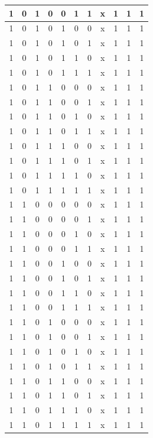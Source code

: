 \documentclass[conference]{IEEEtran}
\begin{document}
\begin{table}[htbp]
\begin{center}
\begin{tabular}{|c|c|c|c|c|c|c|c|c|c|c|}
\hline
1 & 0 & 1 & 0 & 0 & 1 & 1 & x & 1 & 1 & 1 \\
\hline
1 & 0 & 1 & 0 & 1 & 0 & 0 & x & 1 & 1 & 1 \\
\hline
1 & 0 & 1 & 0 & 1 & 0 & 1 & x & 1 & 1 & 1 \\
\hline
1 & 0 & 1 & 0 & 1 & 1 & 0 & x & 1 & 1 & 1 \\
\hline
1 & 0 & 1 & 0 & 1 & 1 & 1 & x & 1 & 1 & 1 \\
\hline
1 & 0 & 1 & 1 & 0 & 0 & 0 & x & 1 & 1 & 1 \\
\hline
1 & 0 & 1 & 1 & 0 & 0 & 1 & x & 1 & 1 & 1 \\
\hline
1 & 0 & 1 & 1 & 0 & 1 & 0 & x & 1 & 1 & 1 \\
\hline
1 & 0 & 1 & 1 & 0 & 1 & 1 & x & 1 & 1 & 1 \\
\hline
1 & 0 & 1 & 1 & 1 & 0 & 0 & x & 1 & 1 & 1 \\
\hline
1 & 0 & 1 & 1 & 1 & 0 & 1 & x & 1 & 1 & 1 \\
\hline
1 & 0 & 1 & 1 & 1 & 1 & 0 & x & 1 & 1 & 1 \\
\hline
1 & 0 & 1 & 1 & 1 & 1 & 1 & x & 1 & 1 & 1 \\
\hline
1 & 1 & 0 & 0 & 0 & 0 & 0 & x & 1 & 1 & 1 \\
\hline
1 & 1 & 0 & 0 & 0 & 0 & 1 & x & 1 & 1 & 1 \\
\hline
1 & 1 & 0 & 0 & 0 & 1 & 0 & x & 1 & 1 & 1 \\
\hline
1 & 1 & 0 & 0 & 0 & 1 & 1 & x & 1 & 1 & 1 \\
\hline
1 & 1 & 0 & 0 & 1 & 0 & 0 & x & 1 & 1 & 1 \\
\hline
1 & 1 & 0 & 0 & 1 & 0 & 1 & x & 1 & 1 & 1 \\
\hline
1 & 1 & 0 & 0 & 1 & 1 & 0 & x & 1 & 1 & 1 \\
\hline
1 & 1 & 0 & 0 & 1 & 1 & 1 & x & 1 & 1 & 1 \\
\hline
1 & 1 & 0 & 1 & 0 & 0 & 0 & x & 1 & 1 & 1 \\
\hline
1 & 1 & 0 & 1 & 0 & 0 & 1 & x & 1 & 1 & 1 \\
\hline
1 & 1 & 0 & 1 & 0 & 1 & 0 & x & 1 & 1 & 1 \\
\hline
1 & 1 & 0 & 1 & 0 & 1 & 1 & x & 1 & 1 & 1 \\
\hline
1 & 1 & 0 & 1 & 1 & 0 & 0 & x & 1 & 1 & 1 \\
\hline
1 & 1 & 0 & 1 & 1 & 0 & 1 & x & 1 & 1 & 1 \\
\hline
1 & 1 & 0 & 1 & 1 & 1 & 0 & x & 1 & 1 & 1 \\
\hline
1 & 1 & 0 & 1 & 1 & 1 & 1 & x & 1 & 1 & 1 \\

\end{tabular}
\end{center}
\end{table}
\end{document}
